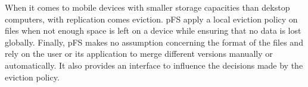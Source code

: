 When it comes to mobile devices with smaller storage capacities than
dekstop computers, with replication comes eviction. pFS apply a local
eviction policy on files when not enough space is left on a device
while ensuring that no data is lost globally. Finally, pFS makes no
assumption concerning the format of the files and rely on the user or
its application to merge different versions manually or automatically.
It also provides an interface to influence the decisions made by the
eviction policy.

